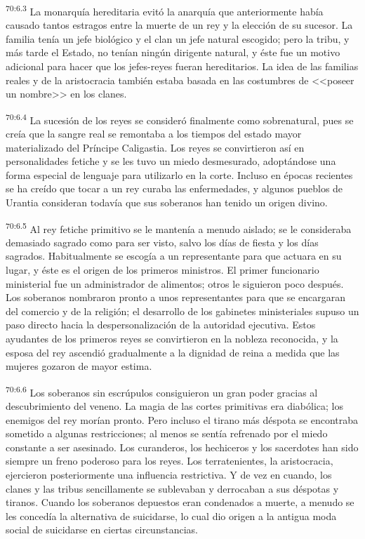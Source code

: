 \par
\textsuperscript{70:6.3} La monarquía hereditaria evitó la anarquía que anteriormente había causado tantos estragos entre la muerte de un rey y la elección de su sucesor. La familia tenía un jefe biológico y el clan un jefe natural escogido; pero la tribu, y más tarde el Estado, no tenían ningún dirigente natural, y éste fue un motivo adicional para hacer que los jefes-reyes fueran hereditarios. La idea de las familias reales y de la aristocracia también estaba basada en las costumbres de <<poseer un nombre>> en los clanes.

\par
\textsuperscript{70:6.4} La sucesión de los reyes se consideró finalmente como sobrenatural, pues se creía que la sangre real se remontaba a los tiempos del estado mayor materializado del Príncipe Caligastia. Los reyes se convirtieron así en personalidades fetiche y se les tuvo un miedo desmesurado, adoptándose una forma especial de lenguaje para utilizarlo en la corte. Incluso en épocas recientes se ha creído que tocar a un rey curaba las enfermedades, y algunos pueblos de Urantia consideran todavía que sus soberanos han tenido un origen divino.

\par
\textsuperscript{70:6.5} Al rey fetiche primitivo se le mantenía a menudo aislado; se le consideraba demasiado sagrado como para ser visto, salvo los días de fiesta y los días sagrados. Habitualmente se escogía a un representante para que actuara en su lugar, y éste es el origen de los primeros ministros. El primer funcionario ministerial fue un administrador de alimentos; otros le siguieron poco después. Los soberanos nombraron pronto a unos representantes para que se encargaran del comercio y de la religión; el desarrollo de los gabinetes ministeriales supuso un paso directo hacia la despersonalización de la autoridad ejecutiva. Estos ayudantes de los primeros reyes se convirtieron en la nobleza reconocida, y la esposa del rey ascendió gradualmente a la dignidad de reina a medida que las mujeres gozaron de mayor estima.

\par
\textsuperscript{70:6.6} Los soberanos sin escrúpulos consiguieron un gran poder gracias al descubrimiento del veneno. La magia de las cortes primitivas era diabólica; los enemigos del rey morían pronto. Pero incluso el tirano más déspota se encontraba sometido a algunas restricciones; al menos se sentía refrenado por el miedo constante a ser asesinado. Los curanderos, los hechiceros y los sacerdotes han sido siempre un freno poderoso para los reyes. Los terratenientes, la aristocracia, ejercieron posteriormente una influencia restrictiva. Y de vez en cuando, los clanes y las tribus sencillamente se sublevaban y derrocaban a sus déspotas y tiranos. Cuando los soberanos depuestos eran condenados a muerte, a menudo se les concedía la alternativa de suicidarse, lo cual dio origen a la antigua moda social de suicidarse en ciertas circunstancias.


